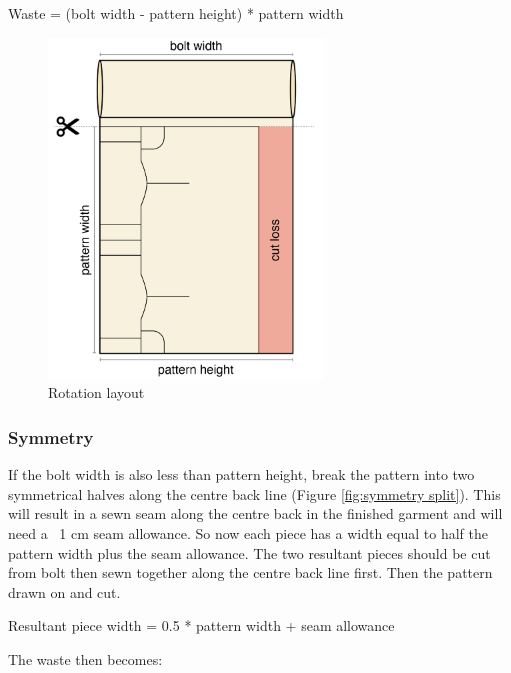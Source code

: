 Waste = (bolt width - pattern height) * pattern width
\begin{figure} [htb]
    \centering
    \includegraphics[width = 0.65\textwidth]{Images/rotation layout.png}
    \caption{Rotation layout}
    \label{fig:ph along bolt}
\end{figure}

\subsubsection{Symmetry}
If the bolt width is also less than pattern height, break the pattern into two symmetrical halves along the centre back line (Figure \ref{fig:symmetry split}). This will result in a sewn seam along the centre back in the finished garment and will need a ~1 cm seam allowance. So now each piece has a width equal to half the pattern width plus the seam allowance. The two resultant pieces should be cut from bolt then sewn together along the centre back line first. Then the pattern drawn on and cut.

Resultant piece width = 0.5 * pattern width + seam allowance

The waste then becomes:

